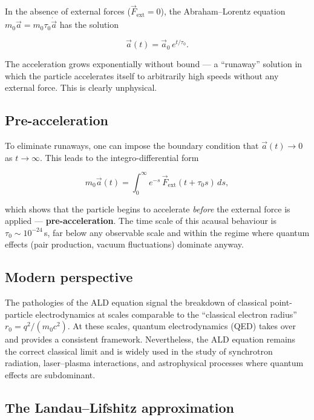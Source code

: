 In the absence of external forces ($\vec{F}_{\text{ext}} = 0$), the Abraham--Lorentz equation $m_0\vec{a} = m_0\tau_0\dot{\vec{a}}$ has the solution

\begin{equation}
\vec{a}(t) = \vec{a}_0\,e^{t/\tau_0}.
\end{equation}

The acceleration grows exponentially without bound --- a ``runaway'' solution in which the particle accelerates itself to arbitrarily high speeds without any external force. This is clearly unphysical.

\subsection{Pre-acceleration}

To eliminate runaways, one can impose the boundary condition that $\vec{a}(t) \to 0$ as $t \to \infty$. This leads to the integro-differential form

\begin{equation}
m_0\vec{a}(t) = \int_0^\infty e^{-s}\,\vec{F}_{\text{ext}}(t + \tau_0 s)\,ds,
\end{equation}

which shows that the particle begins to accelerate \emph{before} the external force is applied --- \textbf{pre-acceleration}. The time scale of this acausal behaviour is $\tau_0 \sim 10^{-24}$\,s, far below any observable scale and within the regime where quantum effects (pair production, vacuum fluctuations) dominate anyway.

\subsection{Modern perspective}

The pathologies of the ALD equation signal the breakdown of classical point-particle electrodynamics at scales comparable to the ``classical electron radius'' $r_0 = q^2/(m_0 c^2)$. At these scales, quantum electrodynamics (QED) takes over and provides a consistent framework. Nevertheless, the ALD equation remains the correct classical limit and is widely used in the study of synchrotron radiation, laser--plasma interactions, and astrophysical processes where quantum effects are subdominant.

\subsection{The Landau--Lifshitz approximation}

